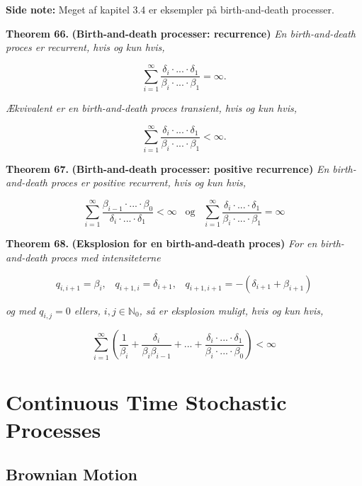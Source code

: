 \documentclass[a4paper,12pt,openany]{book}
\begin{document}
\textbf{Side note:} Meget af kapitel 3.4 er eksempler på birth-and-death processer.

\textbf{Theorem 66.} \textbf{(Birth-and-death processer: recurrence)} \emph{En birth-and-death proces er recurrent, hvis og kun hvis,}

\[
\sum_{i=1}^\infty\frac{\delta_i\cdot...\cdot \delta_1}{\beta_i\cdot...\cdot \beta_1} = \infty.
\]

\emph{Ækvivalent er en birth-and-death proces transient, hvis og kun hvis,}

\[
\sum_{i=1}^\infty\frac{\delta_i\cdot...\cdot \delta_1}{\beta_i\cdot...\cdot \beta_1} < \infty.
\]

\textbf{Theorem 67.} \textbf{(Birth-and-death processer: positive recurrence)} \emph{En birth-and-death proces er positive recurrent, hvis og kun hvis,}

\[
\sum_{i=1}^\infty\frac{\beta_{i-1}\cdot...\cdot \beta_0}{\delta_i\cdot...\cdot \delta_1} < \infty \hspace{10pt} \text{og} \hspace{10pt} \sum_{i=1}^\infty\frac{\delta_i\cdot...\cdot \delta_1}{\beta_i\cdot...\cdot \beta_1} = \infty
\]

\textbf{Theorem 68.} \textbf{(Eksplosion for en birth-and-death proces)} \emph{For en birth-and-death proces med intensiteterne}

\[
q_{i,i+1} = \beta_i, \hspace{10pt} q_{i+1,i}=\delta_{i+1}, \hspace{10pt} q_{i+1,i+1} = -(\delta_{i+1}+\beta_{i+1})
\]

\emph{og med \(q_{i,j} = 0\) ellers, \(i,j \in \mathbb{N}_0\), så er eksplosion muligt, hvis og kun hvis,}

\[
\sum_{i=1}^\infty\left(\frac{1}{\beta_i}+\frac{\delta_i}{\beta_i\beta_{i-1}}+...+\frac{\delta_i\cdot...\cdot \delta_1}{\beta_i\cdot...\cdot \beta_0}\right)<\infty
\]

\hypertarget{continuous-time-stochastic-processes}{%
\chapter{Continuous Time Stochastic Processes}\label{continuous-time-stochastic-processes}}

\hypertarget{brownian-motion}{%
\section{Brownian Motion}\label{brownian-motion}}
\end{document}
